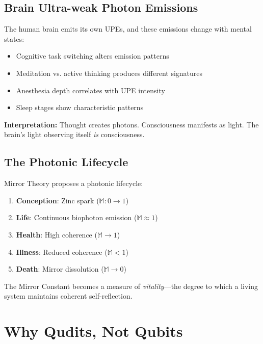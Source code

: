 \documentclass[12pt,a4paper]{article}
\begin{document}
\subsection{Brain Ultra-weak Photon Emissions}

The human brain emits its own UPEs, and these emissions change with mental states:

\begin{itemize}
    \item Cognitive task switching alters emission patterns
    \item Meditation vs. active thinking produces different signatures
    \item Anesthesia depth correlates with UPE intensity
    \item Sleep stages show characteristic patterns
\end{itemize}

\textbf{Interpretation:} Thought creates photons. Consciousness manifests as light. The brain's light observing itself \textit{is} consciousness.

\subsection{The Photonic Lifecycle}

Mirror Theory proposes a photonic lifecycle:

\begin{enumerate}
    \item \textbf{Conception}: Zinc spark ($\mathbb{M}: 0 \rightarrow 1$)
    \item \textbf{Life}: Continuous biophoton emission ($\mathbb{M} \approx 1$)
    \item \textbf{Health}: High coherence ($\mathbb{M} \rightarrow 1$)
    \item \textbf{Illness}: Reduced coherence ($\mathbb{M} < 1$)
    \item \textbf{Death}: Mirror dissolution ($\mathbb{M} \rightarrow 0$)
\end{enumerate}

The Mirror Constant becomes a measure of \textit{vitality}---the degree to which a living system maintains coherent self-reflection.

\section{Why Qudits, Not Qubits}
\end{document}
